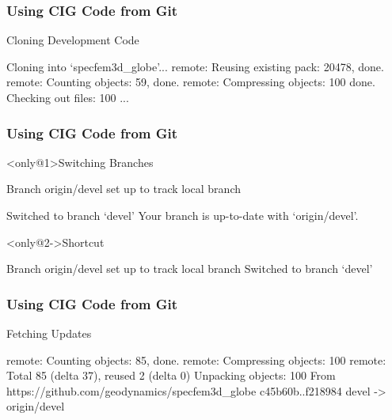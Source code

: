 \begin{frame}[fragile]
 \frametitle{Using CIG Code from Git}

 \begin{exampleblock}{Cloning Development Code}
  \begin{semiverbatim}
Cloning into `specfem3d_globe'...
remote: Reusing existing pack: 20478, done.
remote: Counting objects: 59, done.
remote: Compressing objects: 100%
done.
Checking out files: 100%
...
\end{semiverbatim}
 \end{exampleblock}
\end{frame}

\begin{frame}[fragile]
 \frametitle{Using CIG Code from Git}

 \begin{exampleblock}<only@1>{Switching Branches}
  \begin{semiverbatim}
Branch origin/devel set up to track local branch 

Switched to branch `devel'
Your branch is up-to-date with `origin/devel'.
\end{semiverbatim}
 \end{exampleblock}

 \begin{exampleblock}<only@2->{Shortcut}
  \begin{semiverbatim}
Branch origin/devel set up to track local branch 
Switched to branch `devel'
\end{semiverbatim}
 \end{exampleblock}
\end{frame}

\begin{frame}[fragile]
 \frametitle{Using CIG Code from Git}

 \begin{exampleblock}{Fetching Updates}
  \begin{semiverbatim}
remote: Counting objects: 85, done.
remote: Compressing objects: 100%
remote: Total 85 (delta 37), reused 2 (delta 0)
Unpacking objects: 100%
From https://github.com/geodynamics/specfem3d_globe
   c45b60b..f218984  devel      -> origin/devel
\end{semiverbatim}
 \end{exampleblock}
\end{frame}


